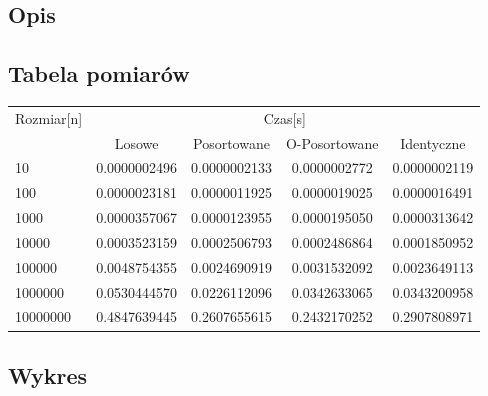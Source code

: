 \documentclass[13pt]{article}
\begin{document}
\subsection{Opis}
\subsection{Tabela pomiarów}

\begin{center}
\begin{tabular}{lcccc} 
\\ 
\toprule
Rozmiar[n] & \multicolumn{4}{c}{Czas[s]} \\
\cmidrule(r){2-5}
 & Losowe & Posortowane & O-Posortowane & Identyczne \\
\midrule
10       & 0.0000002496  & 0.0000002133  & 0.0000002772  & 0.0000002119 \\
100      & 0.0000023181  & 0.0000011925  & 0.0000019025  & 0.0000016491 \\
1000     & 0.0000357067  & 0.0000123955  & 0.0000195050  & 0.0000313642 \\
10000    & 0.0003523159  & 0.0002506793  & 0.0002486864  & 0.0001850952 \\
100000   & 0.0048754355  & 0.0024690919  & 0.0031532092  & 0.0023649113 \\
1000000  & 0.0530444570  & 0.0226112096  & 0.0342633065  & 0.0343200958 \\
10000000 & 0.4847639445  & 0.2607655615  & 0.2432170252  & 0.2907808971 \\
\bottomrule
\end{tabular}
\end{center}

\subsection{Wykres}
\end{document}

